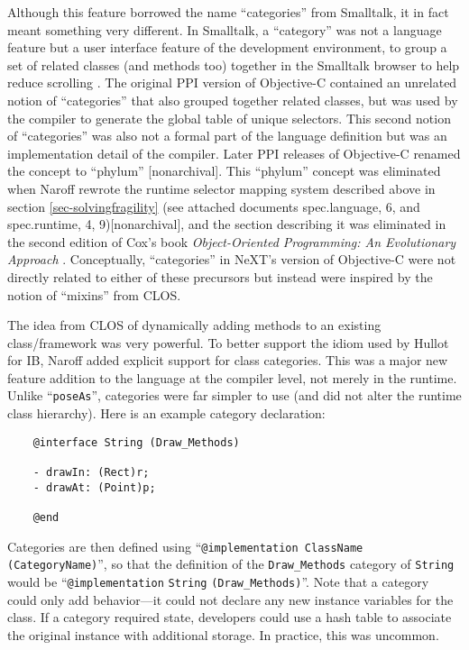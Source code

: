\documentclass[acmsmall]{acmart}\settopmatter{}
\begin{document}
Although this feature borrowed the name ``categories'' from Smalltalk, it in fact meant something very different. In Smalltalk, a ``category'' was not a language feature but a user interface feature of the development environment, to group a set of related classes (and methods too) together in the Smalltalk browser to help reduce scrolling \citetext{\citealp[122, 124]{tesler_smalltalk_1981}; \citealp{tesler_oral_2013}}. The original PPI version of Objective-C contained an unrelated notion of ``categories'' that also grouped together related classes, but was used by the compiler to generate the global table of unique selectors. This second notion of ``categories'' was also not a formal part of the language definition but was an implementation detail of the compiler. Later PPI releases of Objective-C renamed the concept to ``phylum'' \citetext{\citealp[84--88]{cox_object-oriented_1986}, see also the attached document, spec.runtime, 9}[nonarchival]. This ``phylum'' concept was eliminated when Naroff rewrote the runtime selector mapping system described above in section \ref{sec-solvingfragility} (see attached documents spec.language, 6, and spec.runtime, 4, 9)[nonarchival], and the section describing it was eliminated in the second edition of Cox's book \emph{Object-Oriented Programming: An Evolutionary Approach} \citep[88--89]{cox_object-oriented_1991}. Conceptually, ``categories'' in NeXT's version of Objective-C were not directly related to either of these precursors but instead were inspired by the notion of ``mixins'' from CLOS.

The idea from CLOS of dynamically adding methods to an existing class/framework was very powerful. To better support the idiom used by Hullot for IB, Naroff added explicit support for class categories. This was a major new feature addition to the language at the compiler level, not merely in the runtime. Unlike ``\verb$poseAs$'', categories were far simpler to use (and did not alter the runtime class hierarchy). Here is an example category declaration:
\begin{verbatim}
    @interface String (Draw_Methods)

    - drawIn: (Rect)r; 
    - drawAt: (Point)p; 

    @end
\end{verbatim}
Categories are then defined using ``\verb$@implementation ClassName (CategoryName)$'', so that the definition of the \verb$Draw_Methods$ category of \verb$String$ would be ``\verb$@implementation$ \verb$String$ \verb$(Draw_Methods)$''. Note that a category could only add behavior---it could not declare any new instance variables for the class. If a category required state, developers could use a hash table to associate the original instance with additional storage. In practice, this was uncommon.
\end{document}
